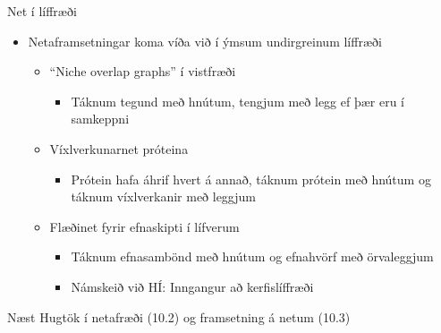 \documentclass[handout]{beamer}
\begin{document}
\begin{frame}{Net í líffræði}
\begin{itemize}
 \item Netaframsetningar koma víða við í ýmsum undirgreinum líffræði
 \begin{itemize}
  \item ``Niche overlap graphs'' í vistfræði
  \begin{itemize}
   \item Táknum tegund með hnútum, tengjum með legg ef þær eru í samkeppni
  \end{itemize}
  \item Víxlverkunarnet próteina
  \begin{itemize}
   \item Prótein hafa áhrif hvert á annað, táknum prótein með hnútum og táknum víxlverkanir með leggjum
  \end{itemize}
  \item Flæðinet fyrir efnaskipti í lífverum
  \begin{itemize}
   \item Táknum efnasambönd með hnútum og efnahvörf með örvaleggjum
   \item Námskeið við HÍ: Inngangur að kerfislíffræði
  \end{itemize}
 \end{itemize}
\end{itemize}
\end{frame}


\begin{frame}{Næst}
Hugtök í netafræði (10.2) og framsetning á netum (10.3)
\end{frame}
\end{document}
